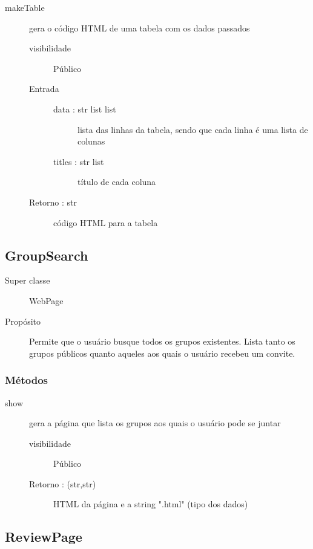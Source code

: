 \documentclass[a4paper]{article}
\begin{document}
\begin{description}
			\item [makeTable] gera o código HTML de uma tabela com os dados passados
			\begin{description} %
				\item [visibilidade] Público
				\item [Entrada] \mbox{}
				\begin{description} %
				 \item [data : str list list] lista das linhas da tabela, sendo que cada linha é uma lista de colunas
				 \item [titles : str list] título de cada coluna
				\end{description} %
				\item [Retorno : str] código HTML para a tabela
			\end{description} %
		\end{description} %
		
	
	\subsection{GroupSearch}
	
	\begin{description}
		\item [Super classe] WebPage
		\item [Propósito] Permite que o usuário busque todos os grupos existentes. Lista tanto os grupos públicos quanto aqueles aos quais o usuário recebeu um convite.
	\end{description}
	
	\subsubsection{Métodos}
		\begin{description} %
		 \item [show] gera a página que lista os grupos aos quais o usuário pode se juntar
			\begin{description} %
				\item [visibilidade] Público			 
				\item [Retorno : (str,str)] HTML da página e a string ".html" (tipo dos dados)
			\end{description} %
		\end{description} %
	
	\subsection{ReviewPage}
	
\end{document}

